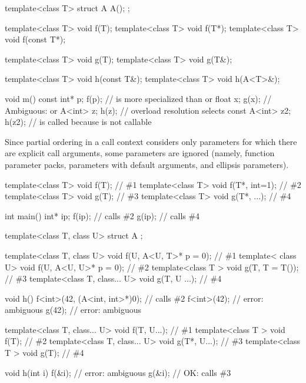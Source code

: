 \begin{codeblock}
template<class T> struct A { A(); };

template<class T> void f(T);
template<class T> void f(T*);
template<class T> void f(const T*);

template<class T> void g(T);
template<class T> void g(T&);

template<class T> void h(const T&);
template<class T> void h(A<T>&);

void m() {
  const int* p;
  f(p);             //  is more specialized than  or 
  float x;
  g(x);             // Ambiguous:  or 
  A<int> z;
  h(z);             // overload resolution selects 
  const A<int> z2;
  h(z2);            //  is called because  is not callable
}
\end{codeblock}
\exitexample

\pnum
\enternote Since partial ordering in a call context considers only parameters
for which there are explicit call arguments, some parameters are ignored (namely,
function parameter packs, parameters with default arguments, and ellipsis
parameters).
\enterexample

\begin{codeblock}
template<class T> void f(T);            // \#1
template<class T> void f(T*, int=1);    // \#2
template<class T> void g(T);            // \#3
template<class T> void g(T*, ...);      // \#4

\end{codeblock}
\begin{codeblock}
int main() {
  int* ip;
  f(ip);            // calls \#2
  g(ip);            // calls \#4
}
\end{codeblock}
\exitexample\enterexample
\begin{codeblock}
template<class T, class U> struct A { };

template<class T, class U> void f(U, A<U, T>* p = 0); // \#1
template<         class U> void f(U, A<U, U>* p = 0); // \#2
template<class T         > void g(T, T = T());        // \#3
template<class T, class... U> void g(T, U ...);       // \#4

void h() {
  f<int>(42, (A<int, int>*)0);                        // calls \#2
  f<int>(42);                                         // error: ambiguous
  g(42);                                              // error: ambiguous
}
\end{codeblock}
\exitexample\enterexample
\begin{codeblock}
template<class T, class... U> void f(T, U...);        // \#1
template<class T            > void f(T);              // \#2
template<class T, class... U> void g(T*, U...);       // \#3
template<class T            > void g(T);              // \#4

void h(int i) {
  f(&i);                                              // error: ambiguous
  g(&i);                                              // OK: calls \#3
}
\end{codeblock}
\exitexample\exitnote


